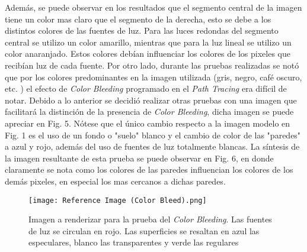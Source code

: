 \documentclass[conference]{IEEEtran}
\begin{document}
Además, se puede observar en los resultados que el segmento central de la imagen tiene un color mas claro que el segmento de la derecha, esto se debe a los distintos colores de las fuentes de luz. Para las luces redondas del segmento central se utilizo un color amarillo, mientras que para la luz lineal se utilizo un color anaranjado. Estos colores debían influenciar los colores de los pixeles que recibían luz de cada fuente. Por otro lado, durante las pruebas realizadas se notó que por los colores predominantes en la imagen utilizada (gris, negro, café oscuro, etc. ) el efecto de \textit{Color Bleeding} programado en el \textit{Path Tracing} era difícil de notar. Debido a lo anterior se decidió realizar otras pruebas con una imagen que facilitará la distinción de la presencia de \textit{Color Bleeding}, dicha imagen se puede apreciar en Fig. 5. Nótese que el único cambio respecto a la imagen modelo en Fig. 1 es el uso de un fondo o "suelo" blanco y el cambio de color de las "paredes" a azul y rojo, además del uso de fuentes de luz totalmente blancas. La síntesis de la imagen resultante de esta prueba se puede observar en Fig. 6, en donde claramente se nota como los colores de las paredes influencian los colores de los demás pixeles, en especial los mas cercanos a dichas paredes. 

\begin{figure}[htbp]
\centerline{\texttt{[image: Reference Image (Color Bleed).png]}}
\caption{Imagen a renderizar para la prueba del \textit{Color Bleeding}. Las fuentes de luz se circulan en rojo. Las superficies se resaltan en azul las especulares, blanco las transparentes y verde las regulares}
\label{Imagen de referencia color bleeding}
\end{figure}
\end{document}

